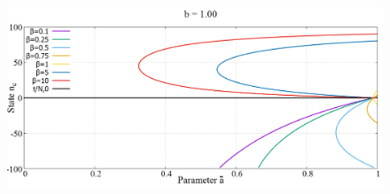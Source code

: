 \begin{figure}[h!]
 \centering
  \includegraphics[width=\linewidth]{images/appendix/phaseSpace/10.png}
\end{figure}
